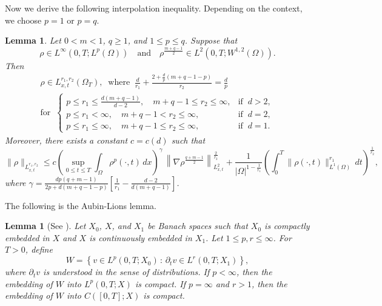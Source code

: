 \documentclass{amsart}
\newtheorem{lemma}[defn]{Lemma}
\numberwithin{equation}{section}
\begin{document}
Now we derive the following interpolation inequality. Depending on the context, we choose $p=1$ or $p=q$.
 \begin{lemma}\label{L:interpolation}\cite[Lemma~3.4]{HKK01}
 Let $0<m<1$, $q \geq 1$, and $1\leq p \leq q$. Suppose that
 \begin{equation*}\label{rho-space}
 \rho \in L^{\infty}(0, T; L^{p}(\Omega)) \quad \text{and} \quad
 \rho^{\frac{m+q-1}{2}} \in L^{2}(0, T; W^{1,2}(\Omega)).
 \end{equation*}
  Then 
 \begin{equation*}\label{L:r1r2}
 \begin{gathered}
\rho\in L^{r_1, r_2}_{x, t} (\Omega_{T}), \ \text{ where } \ \frac{d}{r_1} + \frac{2 + \frac{d}{p}(m+q-1-p)}{r_2} = \frac{d}{p}  \\
 \text{for } \  
 \begin{cases}
  p \leq r_1 \leq \frac{d(m+q-1)}{d-2},  \quad m+q-1 \leq r_2 \leq \infty, & \text{if } \ d > 2, \\
  p \leq r_1 < \infty, \quad m+q-1 < r_2 \leq \infty, &\text{if }\ d = 2, \\
  p \leq r_1 \leq \infty, \quad m+q-1 \leq r_2 \leq \infty, &\text{if } \ d= 1.
  \end{cases}
\end{gathered}
\end{equation*}
Moreover, there exists a constant $c=c(d)$ such that
 \begin{equation*}\label{norm-q-r1r2}
\|\rho\|_{L^{r_1, r_2}_{x, t}} \leq c\left(\sup_{0\leq t \leq T} \int_{\Omega} \rho^{p}(\cdot, t) \,dx\right)^{\gamma} \,
\left\|\nabla \rho^{\frac{q+m-1}{2}} \right\|_{L^{2}_{x,t}}^{\frac{2}{r_2}}
+ \frac{1}{|\Omega|^{1-\frac{1}{r_1}}} \left(\int_{0}^{T} \|\rho(\cdot, t)\|_{L^{1}(\Omega)}^{r_1}\,dt\right)^{\frac{1}{r_2}},
\end{equation*}
where $\gamma = \frac{d p(q+m-1)}{2p+d(m+q-1-p)} \left[\frac{1}{r_1}-\frac{d-2}{d(m+q-1)}\right]$.
 \end{lemma}

The following is the Aubin-Lions lemma.
\begin{lemma}[See \cite{Sim87}]\label{AL}
Let $X_0$, $X$, and $X_1$ be Banach spaces such that $X_0$ is compactly embedded in $X$ and $X$ is continuously embedded in $X_1$.
Let $1\leq p,r \leq \infty$.
For $T>0$, define
\[
W = \left\{ v\in L^{p}(0,T;X_0) \,:\, \partial_t v\in L^{r}(0,T;X_1)\right\},
\]
where $\partial_t v$ is understood in the sense of distributions.
If $p<\infty$, then the embedding of $W$ into $L^{p}(0,T;X)$ is compact.
If $p=\infty$ and $r>1$, then the embedding of $W$ into $C([0,T];X)$ is compact.
\end{lemma}
\end{document}
